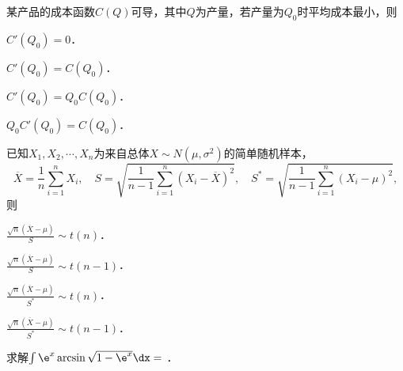 \documentclass[plain,noanswer,medmath]{../../template/jnuexam}
\begin{document}












\begin{problem}
某产品的成本函数$C(Q)$可导，其中$Q$为产量，若产量为$Q_0$时平均成本最小，则\pickout{}
\begin{abcd}
\item $C'(Q_0) = 0$．
\item $C'(Q_0) = C(Q_0)$．
\item $C'(Q_0) = Q_0 C(Q_0)$．
\item $Q_0 C'(Q_0) = C(Q_0)$．
\end{abcd}
\end{problem}








\begin{problem}
已知$X_1,X_2, \cdots ,X_n$为来自总体$X \sim N\left(\mu ,\sigma^2 \right)$的简单随机样本，
$$\overline{X} = \frac{1}{n}\sum_{i = 1}^n X_i,\quad
  S = \sqrt{\frac{1}{n - 1}\sum_{i = 1}^n \left(X_i - \overline{X} \right)^2},\quad
  S^* = \sqrt{\frac{1}{n - 1}\sum_{i = 1}^n \left(X_i - \mu \right)^2},$$
则\pickout{}
\begin{abcd}
\item $\frac{\sqrt{n} \left(\overline{X} - \mu \right)}{S} \sim t(n)$．
\item $\frac{\sqrt{n} \left(\overline{X} - \mu \right)}{S} \sim t(n - 1)$．
\item $\frac{\sqrt{n} \left(\overline{X} - \mu \right)}{S^*} \sim t(n)$．
\item $\frac{\sqrt{n} \left(\overline{X} - \mu \right)}{S^*} \sim t(n - 1)$．
\end{abcd}
\end{problem}






\begin{problem}
求解$\int \e^x\arcsin \sqrt{1 - \e^x} \dx =$ \fillin{}．
\end{problem}
\end{document}
